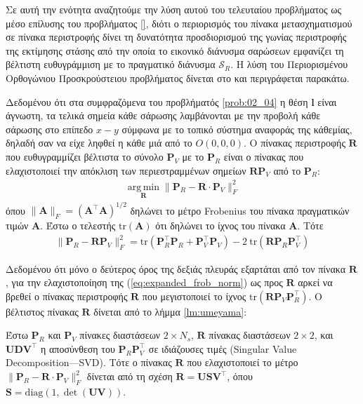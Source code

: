 Σε αυτή την ενότητα αναζητούμε την λύση αυτού του τελευταίου προβλήματος ως
μέσο επίλυσης του προβλήματος \ref{}, διότι ο περιορισμός του πίνακα
μετασχηματισμού σε πίνακα περιστροφής δίνει τη δυνατότητα προσδιορισμού της
γωνίας περιστροφής της εκτίμησης στάσης από την οποία το εικονικό διάνυσμα
σαρώσεων εμφανίζει τη βέλτιστη ευθυγράμμιση με το πραγματικό διάνυσμα
$\mathcal{S}_R$. Η λύση του Περιορισμένου Ορθογώνιου Προσκρούστειου προβλήματος
δίνεται στο \cite{Umeyama1991} και περιγράφεται παρακάτω.

Δεδομένου ότι στα συμφραζόμενα του προβλήματός \ref{prob:02_04} η θέση $\bm{l}$
είναι άγνωστη, τα τελικά σημεία κάθε σάρωσης λαμβάνονται με την προβολή κάθε
σάρωσης στο επίπεδο $x-y$ σύμφωνα με το τοπικό σύστημα αναφοράς της κάθεμίας,
δηλαδή σαν να είχε ληφθεί η κάθε μιά από το $O(0,0,0)$. Ο πίνακας περιστροφής
$\bm{R}$ που ευθυγραμμίζει βέλτιστα το σύνολο $\bm{P}_V$ με το $\bm{P}_R$ είναι
ο πίνακας που ελαχιστοποιεί την απόκλιση των περιεστραμμένων σημείων
$\bm{R}\bm{P}_V$ από το $\bm{P}_R$:
\begin{align}
  \operatorname*{arg\,min}\limits_{\bm{R}} \|\bm{P}_R - \bm{R} \cdot \bm{P}_V\|_F^2 \nonumber
\end{align}
όπου $\|\bm{A}\|_F = (\bm{A}^\top\bm{A})^{1/2}$ δηλώνει το μέτρο Frobenius του
πίνακα πραγματικών τιμών $\bm{A}$. Έστω ο τελεστής $\text{tr}(\bm{A})$ ότι
δηλώνει το ίχνος του πίνακα $\bm{A}$. Τότε
\begin{align}
  \|\bm{P}_R - \bm{R} \bm{P}_V\|_F^2 = \text{tr}(\bm{P}_R^\top \bm{P}_R + \bm{P}_V^\top \bm{P}_V) - 2 \ \text{tr}(\bm{R} \bm{P}_R \bm{P}_V^\top)
  \label{eq:expanded_frob_norm}
\end{align}

Δεδομένου ότι μόνο ο δεύτερος όρος της δεξιάς πλευράς εξαρτάται από τον πίνακα
$\bm{R}$, για την ελαχιστοποίηση της (\ref{eq:expanded_frob_norm}) ως προς
$\bm{R}$ αρκεί να βρεθεί ο πίνακας περιστροφής $\bm{R}$ που μεγιστοποιεί
το ίχνος $\text{tr}(\bm{R} \bm{P}_V \bm{P}_R^\top)$. Ο βέλτιστος πίνακας
$\bm{R}$ δίνεται από το λήμμα \ref{lm:umeyama}:

\begin{lemma}
  \label{lm:umeyama}
  Έστω $\bm{P}_R$ και $\bm{P}_V$ πίνακες διαστάσεων $2 \times N_s$, $\bm{R}$
  πίνακας διαστάσεων $2 \times 2$, και $\bm{U} \bm{D} \bm{V}^\top$ η αποσύνθεση
  του $\bm{P}_R \bm{P}_V^\top$ σε ιδιάζουσες τιμές (Singular Value
  Decomposition---SVD). Τότε ο πίνακας $\bm{R}$ που ελαχιστοποιεί το μέτρο
  $\|\bm{P}_R - \bm{R} \cdot \bm{P}_V\|_F^2$ δίνεται από τη σχέση
  $\bm{R} = \bm{U} \bm{S} \bm{V}^\top$, όπου
  $\bm{S} = \text{diag}(1,\det{(\bm{U}\bm{V})})$.
\end{lemma}

